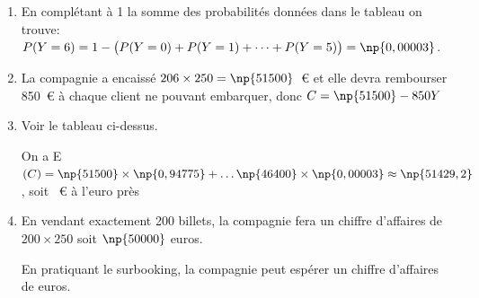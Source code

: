 \begin{enumerate}
	\begin{enumerate}
		\item %
En complétant à 1 la somme des probabilités données dans le tableau on trouve:\\
 $P(Y = 6) =1 - \left ( P(Y=0) + P(Y=1) + \cdots + P(Y=5)\strut\right )= \np{0,00003}$.
 
		\item %
La compagnie a encaissé $206 \times 250 = \np{51500}$~\euro{} et elle devra rembourser 850~\euro{} à chaque client ne pouvant embarquer, donc $C = \np{51500} - 850Y$
		\item %
Voir le tableau ci-dessus.

On a E$(C) = \np{51500} \times \np{0,94775} + \ldots \np{46400} \times \np{0,00003} \approx \np{51429,2}$, soit ~\euro{} à l'euro près

		\item %
En vendant exactement 200 billets, la compagnie fera un chiffre d'affaires de $200\times 250$ soit $\np{50000}$ euros.

En pratiquant le surbooking, la compagnie peut espérer un chiffre d'affaires de  euros.
	\end{enumerate}
\end{enumerate}

\bigskip

